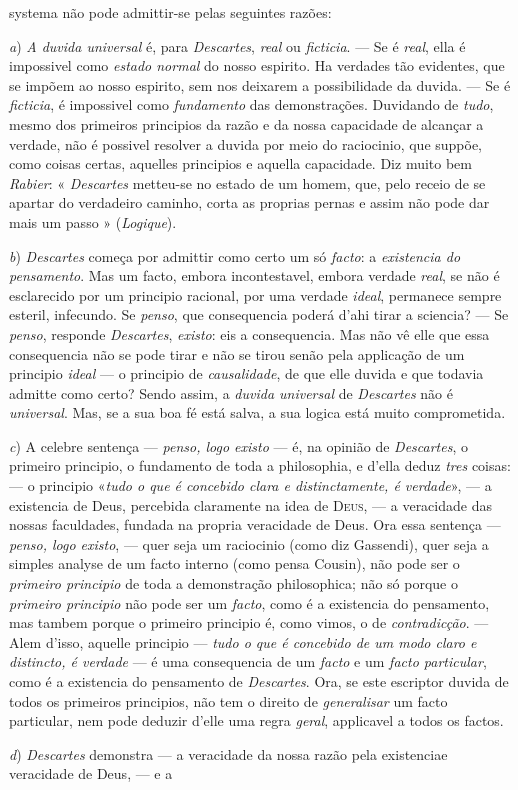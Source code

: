 systema não pode admittir-se pelas seguintes razões:\par \emph{a}) \emph{A duvida universal} é, para \emph{Descartes}, \emph{real} ou \emph{ficticia}. --- Se é \emph{real}, ella é impossivel como \emph{estado normal} do nosso espirito. Ha verdades tão evidentes, que se impõem ao nosso espirito, sem nos deixarem a possibilidade da duvida. --- Se é \emph{ficticia}, é impossivel como \emph{fundamento} das demonstrações. Duvidando de \emph{tudo}, mesmo dos primeiros principios da razão e da nossa capacidade de alcançar a verdade, não é possivel resolver a duvida por meio do raciocinio, que suppõe, como coisas certas, aquelles principios e aquella capacidade. Diz muito bem \emph{Rabier}: « \emph{Descartes} metteu-se no estado de um homem, que, pelo receio de se apartar do verdadeiro caminho, corta as proprias pernas e assim não pode dar mais um passo » (\emph{Logique}).\par \emph{b}) \emph{Descartes} começa por admittir como certo um só \emph{facto}: a \emph{existencia do pensamento}. Mas um facto, embora incontestavel, embora verdade \emph{real}, se não é esclarecido por um principio racional, por uma verdade \emph{ideal}, permanece sempre esteril, infecundo. Se \emph{penso}, que consequencia poderá d'ahi tirar a sciencia? --- Se \emph{penso}, responde \emph{Descartes}, \emph{existo}: eis a consequencia. Mas não vê elle que essa consequencia não se pode tirar e não se tirou senão pela applicação de um principio \emph{ideal} --- o principio de \emph{causalidade}, de que elle duvida e que todavia admitte como certo? Sendo assim, a \emph{duvida universal} de \emph{Descartes} não é \emph{universal}. Mas, se a sua boa fé está salva, a sua logica está muito comprometida.\par \emph{c}) A celebre sentença --- \emph{penso, logo existo} --- é, na opinião de \emph{Descartes}, o primeiro principio, o fundamento de toda a philosophia, e d'ella deduz \emph{tres} coisas: --- o principio «\emph{tudo o que é concebido clara e distinctamente, é verdade}», --- a existencia de Deus, percebida claramente na idea de \textsc{Deus}, --- a veracidade das nossas faculdades, fundada na propria veracidade de Deus. Ora essa sentença --- \emph{penso, logo existo}, --- quer seja um raciocinio (como diz Gassendi), quer seja a simples analyse de um facto interno (como pensa Cousin), não pode ser o \emph{primeiro principio} de toda a demonstração philosophica; não só porque o \emph{primeiro principio} não pode ser um \emph{facto}, como é a existencia do pensamento, mas tambem porque o primeiro principio é, como vimos, o de \emph{contradicção}. --- Alem d'isso, aquelle principio --- \emph{tudo o que é concebido de um modo claro e distincto, é verdade} --- é uma consequencia de um \emph{facto} e um \emph{facto particular}, como é a existencia do pensamento de \emph{Descartes}. Ora, se este escriptor duvida de todos os primeiros principios, não tem o direito de \emph{generalisar} um facto particular, nem pode deduzir d'elle uma regra \emph{geral}, applicavel a todos os factos.\par \emph{d}) \emph{Descartes} demonstra --- a veracidade da nossa razão pela existenciae veracidade de Deus, --- e a 